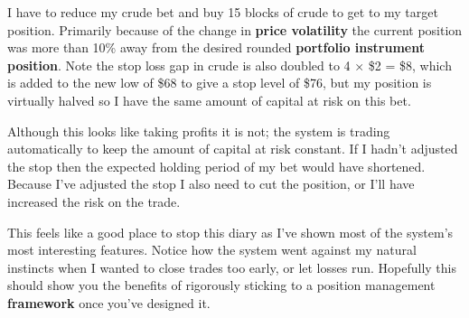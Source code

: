 
I have to reduce my crude bet and buy 15 blocks of crude to get to my target position. Primarily because of the change in \textbf{price volatility} the current position was more than 10\% away from the desired rounded \textbf{portfolio instrument position}. Note the stop loss gap in crude is also doubled to 4 × \$2 = \$8, which is added to the new low of \$68 to give a stop level of \$76, but my position is virtually halved so I have the same amount of capital at risk on this bet.

Although this looks like taking profits it is not; the system is trading automatically to keep the amount of capital at risk constant. If I hadn't adjusted the stop then the expected holding period of my bet would have shortened. Because I've adjusted the stop I also need to cut the position, or I'll have increased the risk on the trade.

This feels like a good place to stop this diary as I've shown most of the system's most interesting features. Notice how the system went against my natural instincts when I wanted to close trades too early, or let losses run. Hopefully this should show you the benefits of rigorously sticking to a position management \textbf{framework} once you've designed it.
